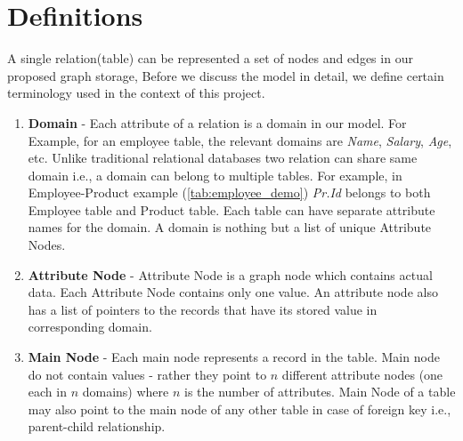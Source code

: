 \documentclass[12pt, oneside]{book}
\begin{document}
\section{Definitions}
A single relation(table) can be represented a set of nodes and edges in our proposed graph storage, Before we discuss the model in detail, we define certain terminology used in the context of this project.
\begin{enumerate}
 \item \textbf{Domain} - Each attribute of a relation is a domain in our model. For Example, for an employee table, the relevant domains are \emph{Name}, \emph{Salary}, \emph{Age}, etc. Unlike traditional relational databases two relation can share same domain i.e., a domain can belong to multiple tables. For example, in Employee-Product example (\ref{tab:employee_demo}) \emph{Pr.Id} belongs to both Employee table and Product table. Each table can have separate attribute names for the domain. A domain is nothing but a list of unique Attribute Nodes.
 \item \textbf{Attribute Node} - Attribute Node is a graph node which contains actual data. Each Attribute Node contains only one value. An attribute node also has a list of pointers to the records that have its stored value in corresponding domain.
 \item \textbf{Main Node} - Each main node represents a record in the table. Main node do not contain values - rather they point to $n$ different attribute nodes (one each in $n$ domains) where $n$ is the number of attributes. Main Node of a table may also point to the main node of any other table in case of foreign key i.e., parent-child relationship.
\end{enumerate}
\end{document}
